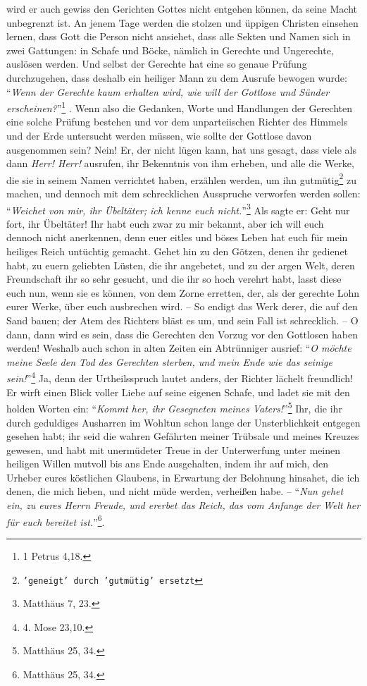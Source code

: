 wird er auch gewiss den Gerichten Gottes nicht entgehen können,
da seine Macht unbegrenzt ist. 
An jenem Tage werden die stolzen und üppigen Christen einsehen lernen, dass Gott
die Person nicht ansiehet,
dass alle Sekten und Namen sich in zwei Gattungen: 
in Schafe und Böcke, nämlich in Gerechte und Ungerechte, auslösen werden.
Und selbst der Gerechte hat eine so genaue Prüfung durchzugehen, dass deshalb ein
heiliger Mann zu dem Ausrufe bewogen wurde: "`\textit{Wenn der Gerechte kaum
erhalten wird, wie will der Gottlose und Sünder erscheinen?}"'\footnote{1
Petrus 4,18.} .
Wenn also die Gedanken, Worte und Handlungen der Gerechten eine solche Prüfung
bestehen und vor dem unparteiischen Richter des Himmels und der Erde untersucht
werden müssen, wie sollte der Gottlose davon ausgenommen sein?
Nein!
Er, der nicht lügen kann, hat uns gesagt, dass viele als dann \textit{Herr!
Herr!} ausrufen, ihr Bekenntnis von ihm erheben, und alle die Werke, die sie in
seinem Namen verrichtet haben, erzählen werden, um ihn gutmütig\footnote{\texttt{'geneigt' durch 'gutmütig' ersetzt}} zu machen, und dennoch mit dem
schrecklichen Ausspruche verworfen werden sollen:
"`\textit{Weichet von mir, ihr Übeltäter; ich kenne euch nicht.}"'\footnote{Matthäus 7, 23.} 
Als sagte er:
Geht nur fort, ihr Übeltäter!
Ihr habt euch zwar zu mir bekannt,
aber ich will euch dennoch nicht anerkennen,
denn euer eitles und böses Leben hat euch für mein heiliges Reich untüchtig
gemacht.
Gehet hin zu den Götzen, denen ihr gedienet habt,
zu euern geliebten Lüsten, die ihr angebetet, und zu der argen Welt, deren
Freundschaft ihr so sehr gesucht, und die ihr so hoch verehrt habt,
lasst diese euch nun, wenn sie es können, von dem Zorne erretten, der, als der
gerechte Lohn eurer Werke, über euch ausbrechen wird.
-- So endigt das Werk derer, die auf den Sand bauen;
der Atem des Richters bläst es um, und sein Fall ist schrecklich.
-- O dann, dann wird es sein, dass die Gerechten den Vorzug vor den Gottlosen
haben werden!
Weshalb auch schon in alten Zeiten ein Abtrünniger ausrief:
"`\textit{O möchte meine Seele den Tod des Gerechten sterben, und mein Ende wie
das seinige sein!}"'\footnote{4. Mose 23,10.} 
Ja, denn der Urtheilsspruch lautet anders,
der Richter lächelt freundlich!
Er wirft einen Blick voller Liebe auf seine eigenen Schafe, und ladet sie mit
den holden Worten ein:
"`\textit{Kommt her, ihr Gesegneten meines Vaters!}"'\footnote{Matthäus 25,
34.} 
Ihr, die ihr durch geduldiges Ausharren im Wohltun schon lange der
Unsterblichkeit entgegen gesehen habt;
ihr seid die wahren Gefährten meiner Trübsale und meines Kreuzes gewesen, und
habt mit unermüdeter Treue in der Unterwerfung unter meinen heiligen Willen
mutvoll bis ans Ende ausgehalten, indem ihr auf mich, den Urheber eures
köstlichen Glaubens, in Erwartung der Belohnung hinsahet, die ich denen, die
mich lieben, und nicht müde werden, verheißen habe.
-- "`\textit{Nun gehet ein, zu eures Herrn Freude, und ererbet das Reich, das
vom Anfange der Welt her für euch bereitet ist.}"'\footnote{Matthäus 25, 34.}.

